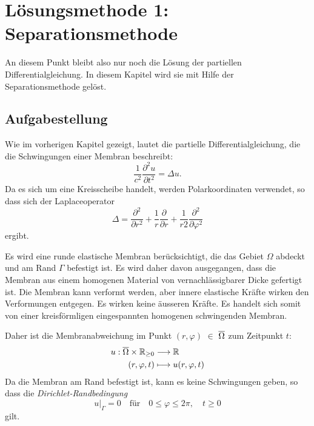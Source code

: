 %
%


\section{Lösungsmethode 1: Separationsmethode 
	\label{kreismembran:section:teil1}}
An diesem Punkt bleibt also nur noch die Lösung der partiellen Differentialgleichung. In diesem Kapitel wird sie mit Hilfe der Separationsmethode gelöst.

\subsection{Aufgabestellung\label{sub:aufgabestellung}}
Wie im vorherigen Kapitel gezeigt, lautet die partielle Differentialgleichung, die die Schwingungen einer Membran beschreibt:
\begin{equation*}
	\frac{1}{c^2}\frac{\partial^2u}{\partial t^2} = \Delta u.
\end{equation*}
Da es sich um eine Kreisscheibe handelt, werden Polarkoordinaten verwendet, so dass sich der Laplaceoperator
\begin{equation*}
	\Delta
	=
	\frac{\partial^2}{\partial r^2}
	+
	\frac1r
	\frac{\partial}{\partial r}
	+
	\frac{1}{r 2}
	\frac{\partial^2}{\partial\varphi^2}
	\label{buch:pde:kreis:laplace}
\end{equation*}
ergibt.

Es wird eine runde elastische Membran berücksichtigt, die das Gebiet $\Omega$ abdeckt und am Rand $\Gamma$ befestigt ist.
Es wird daher davon ausgegangen, dass die Membran aus einem homogenen Material von vernachlässigbarer Dicke gefertigt ist.
Die Membran kann verformt werden, aber innere elastische Kräfte wirken den Verformungen entgegen. Es wirken keine äusseren Kräfte. Es handelt sich somit von einer kreisförmligen eingespannten homogenen schwingenden Membran.

Daher ist die Membranabweichung im Punkt $(r,\varphi)$ $\in$ $\overline{\rm \Omega}$ zum Zeitpunkt $t$:
\begin{align*}
	u: \overline{\rm \Omega} \times \mathbb{R}_{\geq 0} &\longrightarrow \mathbb{R}\\
	(r,\varphi,t) &\longmapsto u(r,\varphi,t)
\end{align*}
Da die Membran am Rand befestigt ist, kann es keine Schwingungen geben, so dass die \textit{Dirichlet-Randbedingung} \cite{prof_dr_horst_knorrer_kreisformige_2013}
\begin{equation*}
	u\big|_{\Gamma} = 0 \quad \text{für} \quad 0 \leq \varphi \leq 2\pi,\quad t \geq 0
\end{equation*}
gilt.

